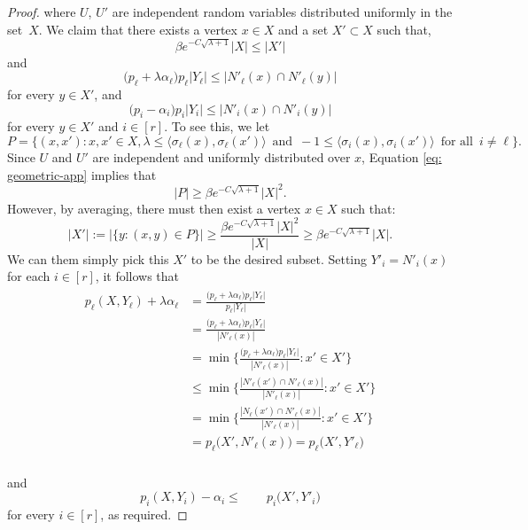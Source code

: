 \begin{proof}
  where $U$, $U'$ are independent random variables distributed uniformly in the set~$X$. We claim that there exists a vertex $x \in X$ and a set $X' \subset X$
  such that,
  $$\beta e^{- C \sqrt{\lambda + 1}} |X| \le |X'|$$ %
  and
  $$\big( p_\ell + \lambda\alpha_\ell \big) p_\ell |Y_\ell | \le |N'_\ell(x) \cap N'_\ell(y)|$$
  for every $y \in X'$, and
  $$\big( p_i - \alpha_i \big) p_i |Y_i| \le |N'_i(x) \cap N'_i(y)|$$
  for every $y \in X'$ and $i \in [r]$. To see this, we let 
  $$ P= \Biggl\{(x,x'): x,x' \in X , \lambda  \le \big\langle \sigma_\ell(x),\sigma_\ell(x') \big\rangle \, \text{ and } \, -1 \le \big\langle \sigma_i(x), \sigma_i(x') \big\rangle \, \text{ for all } \, i \ne \ell  \Biggr\}.$$
  Since $U$ and $U'$ are independent and uniformly distributed over $x$, Equation \ref{eq: geometric-app} implies that
  \begin{equation}
  |P|\geq \beta e^{-C\sqrt{\lambda + 1}}|X|^2.
  \end{equation} 
  However, by averaging, there must then exist a vertex $x \in X$ such that:
  \begin{equation}
|X'|:=\bigl|\{y: (x,y) \in P  \} \bigr| \ge \frac{\beta e^{-C\sqrt{\lambda+1}}|X|^2}{|X|}\geq  \beta e^{-C\sqrt{\lambda+1}}|X|.
  \end{equation}
  We can them simply pick this $X'$ to be the desired subset.
  Setting $Y'_i = N'_i(x)$ for each $i \in [r]$, it follows that
  \begin{multline}
      \begin{aligned}
      p_\ell(X,Y_\ell) + \lambda \alpha_\ell &= \frac{ \big( p_\ell + \lambda\alpha_\ell \big) p_\ell |Y_\ell |}{p_\ell |Y_\ell|}\\
      &= \frac{ \big( p_\ell + \lambda\alpha_\ell \big) p_\ell |Y_\ell |}{| N'_\ell (x)|}\\
      &= \min\bigg\{ \frac{ \big( p_\ell + \lambda\alpha_\ell \big) p_\ell |Y_\ell |}{| N'_\ell (x)|} : x' \in X' \bigg\}\\
      &\le \min\bigg\{ \frac{|N'_\ell(x') \cap  N'_\ell (x)|}{| N'_\ell (x)|} : x' \in X' \bigg\}\\
      &= \min\bigg\{ \frac{|N_\ell(x') \cap  N'_\ell (x)|}{| N'_\ell (x)|} : x' \in X' \bigg\}\\
      &= p_\ell\big( X', N'_\ell (x) \big) = p_\ell\big( X', Y'_\ell \big) \\
    \end{aligned}
  \end{multline}

  and $$  p_i(X,Y_i) - \alpha_i \le \qquad p_i\big( X', Y'_i \big) $$
  for every $i \in [r]$, as required.
\end{proof}


